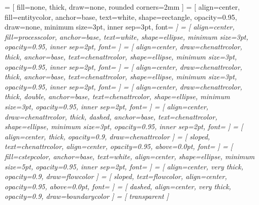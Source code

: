 \usepackage{pgf-umlcd}
\usepackage{tikz}
\usetikzlibrary{automata}
\usetikzlibrary{arrows}
\usetikzlibrary{backgrounds}
\usetikzlibrary{decorations.text}
\usetikzlibrary{decorations.markings}
\usetikzlibrary{fit}
\usetikzlibrary{graphs}
\usetikzlibrary{shapes.geometric}
     = [
      fill=none,
      thick,
      draw=none,
      rounded corners=2mm
    ]
     = [
      align=center,
      fill=entitycolor,
      anchor=base,
      text=white,
      shape=rectangle,
      opacity=0.95,
      draw=none,
      minimum size=3pt,
      inner sep=3pt,
      font=\sffamily\slshape\small
    ]
     = [
      align=center,
      fill=processcolor,
      anchor=base,
      text=white,
      shape=ellipse,
      minimum size=3pt,
      opacity=0.95,
      inner sep=2pt,
      font=\sffamily\small\slshape
    ]
     = [
      align=center,
      draw=chenattrcolor,
      thick,
      anchor=base,
      text=chenattrcolor,
      shape=ellipse,
      minimum size=3pt,
      opacity=0.95,
      inner sep=2pt,
      font=\ttfamily\small
    ]
     = [
      align=center,
      draw=chenattrcolor,
      thick,
      anchor=base,
      text=chenattrcolor,
      shape=ellipse,
      minimum size=3pt,
      opacity=0.95,
      inner sep=2pt,
      font=\ttfamily\footnotesize
    ]
     = [
      align=center,
      draw=chenattrcolor,
      thick,
      double,
      anchor=base,
      text=chenattrcolor,
      shape=ellipse,
      minimum size=3pt,
      opacity=0.95,
      inner sep=2pt,
      font=\ttfamily\small
    ]
     = [
      align=center,
      draw=chenattrcolor,
      thick,
      dashed,
      anchor=base,
      text=chenattrcolor,
      shape=ellipse,
      minimum size=3pt,
      opacity=0.95,
      inner sep=2pt,
      font=\ttfamily\small
    ]
     = [
      align=center,
      thick,
      opacity=0.9,
      draw=chenattrcolor
    ]
     = [
      sloped,
      text=chenattrcolor,
      align=center,
      opacity=0.95,
      above=0.0pt,
      font=\ttfamily\small
    ]
     = [
      fill=cstepcolor,
      anchor=base,
      text=white,
      align=center,
      shape=ellipse,
      minimum size=5pt,
      opacity=0.95,
      inner sep=2pt,
      font=\sffamily\scriptsize\itshape
    ]
     = [
      align=center,
      very thick,
      opacity=0.9,
      draw=flowcolor
    ]
     = [
      sloped,
      text=flowcolor,
      align=center,
      opacity=0.95,
      above=0.0pt,
      font=\sffamily\footnotesize\slshape
    ]
     = [
      dashed,
      align=center,
      very thick,
      opacity=0.9,
      draw=boundarycolor
    ]
     = [
      transparent
    ]


